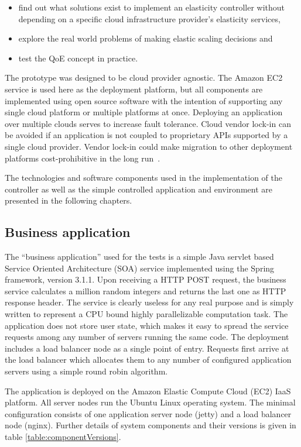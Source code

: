 \documentclass[english]{tktltiki2}
\theoremstyle{definition}
\theoremstyle{remark}
\begin{document}
\begin{itemize}
	\item{find out what solutions exist to implement an elasticity controller
	 without depending on a specific cloud infrastructure provider's elasticity 
	 services,}
	\item{explore the real world problems of making elastic scaling decisions and}
	\item{test the QoE concept in practice.}
\end{itemize}

The prototype was designed to be cloud provider agnostic. The Amazon EC2 service is used here as the deployment platform, but all components are
implemented using open source software with the intention of supporting any
single cloud platform or multiple platforms at once. Deploying an application
over multiple clouds serves to increase fault tolerance. Cloud vendor lock-in can be avoided if an application is not coupled to proprietary APIs supported by a single cloud provider. Vendor lock-in could make migration to other deployment platforms cost-prohibitive in the long run~\cite{Petcu2012}.

The technologies and software components used in the implementation of the
controller as well as the simple controlled application and environment are
presented in the following chapters.

\subsection{Business application}

The ``business application'' used for the tests is a simple Java servlet based
Service Oriented Architecture (SOA) service implemented using the Spring
framework, version 3.1.1. Upon receiving a HTTP POST request, the business
service calculates a million random integers and returns the last one as HTTP
response header. The service is clearly useless for any real purpose and is
simply written to represent a CPU bound highly parallelizable computation task.
The application does not store user state, which makes it easy to spread the
service requests among any number of servers running the same code. The
deployment includes a load balancer node as a single point of entry. Requests
first arrive at the load balancer which allocates them to any number of
configured application servers using a simple round robin algorithm.

The application is deployed on the Amazon Elastic Compute Cloud (EC2) IaaS
platform. All server nodes run the Ubuntu Linux operating system. The minimal
configuration consists of one application server node (jetty) and a load
balancer node (nginx). Further details of system components and their versions
is given in table \ref{table:componentVersions}.
\end{document}
